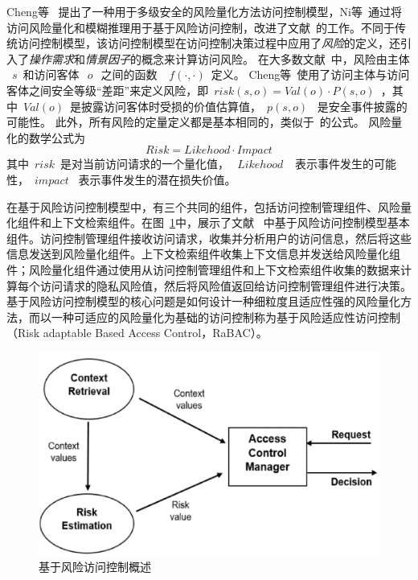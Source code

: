 Cheng等~\cite{cheng2007fuzzy} 提出了一种用于多级安全的风险量化方法访问控制模型，Ni等~\cite{ni2010risk}通过将访问风险量化和模糊推理用于基于风险访问控制，改进了文献~\cite{cheng2007fuzzy}的工作。不同于传统访问控制模型，该访问控制模型在访问控制决策过程中应用了\emph{风险}的定义，还引入了\emph{操作需求}和\emph{情景因子}的概念来计算访问风险。 在大多数文献~\cite{cheng2007fuzzy,ni2010risk,kandala2011attribute,bijon2012risk}中，风险由主体 ~$s$~和访问客体~$~o~$~之间的函数 ~$~f(\cdot, \cdot)$~定义。 Cheng等~\cite{cheng2007fuzzy}使用了访问主体与访问客体之间安全等级“差距”来定义风险，即~$risk(s,o)=Val(o) \cdot P(s,o)$~，其中~$Val(o)$~是披露访问客体时受损的价值估算值，~$p(s,o)$~ 是安全事件披露的可能性。 此外，所有风险的定量定义都是基本相同的，类似于~\cite{cheng2007fuzzy}的公式。 风险量化的数学公式为
\begin{equation}\label{eq:naive_risk}
Risk = Likehood \cdot Impact
\end{equation}
其中~$risk$~是对当前访问请求的一个量化值，~$~Likehood~$~ 表示事件发生的可能性，~$impact$~ 表示事件发生的潜在损失价值。


在基于风险访问控制模型中，有三个共同的组件，包括访问控制管理组件、风险量化组件和上下文检索组件。在图~\ref{fig:rbac}中，展示了文献 ~\cite{diep2007enforcing}中基于风险访问控制模型基本组件。访问控制管理组件接收访问请求，收集并分析用户的访问信息，然后将这些信息发送到风险量化组件。上下文检索组件收集上下文信息并发送给风险量化组件；风险量化组件通过使用从访问控制管理组件和上下文检索组件收集的数据来计算每个访问请求的隐私风险值，然后将风险值返回给访问控制管理组件进行决策。基于风险访问控制模型的核心问题是如何设计一种细粒度且适应性强的风险量化方法，而以一种可适应的风险量化为基础的访问控制称为基于风险适应性访问控制（Risk adaptable Based Access Control，RaBAC）。

\begin{figure}[htb]
	\centering
	\includegraphics[width=.6\textwidth]{./figures/fig-rbac.jpg}
	\caption{基于风险访问控制概述~\cite{diep2007enforcing}}\label{fig:rbac}
\end{figure}

